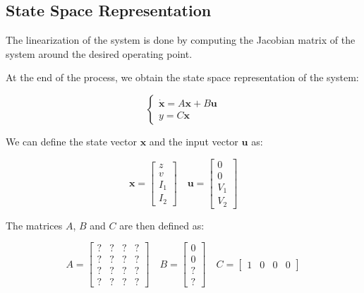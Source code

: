 \subsection{State Space Representation}
\label{subsec:state_space_representation}

The linearization of the system is done by computing the Jacobian matrix of the system around the desired operating point.

At the end of the process, we obtain the state space representation of the system:

\begin{equation}
    \begin{cases}
        \dot{\mathbf{x}} = A \mathbf{x} + B \mathbf{u} \\
        y = C \mathbf{x}
    \end{cases}
\end{equation}

We can define the state vector $\mathbf{x}$ and the input vector $\mathbf{u}$ as:

\begin{equation}
    \mathbf{x} = \begin{bmatrix}
        z   \\
        v   \\
        I_1 \\
        I_2
    \end{bmatrix}
    \quad
    \mathbf{u} = \begin{bmatrix}
        0   \\
        0   \\
        V_1 \\
        V_2
    \end{bmatrix}
\end{equation}

The matrices $A$, $B$ and $C$ are then defined as:

\begin{equation}
    A = \begin{bmatrix}
        ? & ? & ? & ? \\
        ? & ? & ? & ? \\
        ? & ? & ? & ? \\
        ? & ? & ? & ?
    \end{bmatrix}
    \quad
    B = \begin{bmatrix}
        0 \\
        0 \\
        ? \\
        ?
    \end{bmatrix}
    \quad
    C = \begin{bmatrix}
        1 & 0 & 0 & 0
    \end{bmatrix}
\end{equation}
